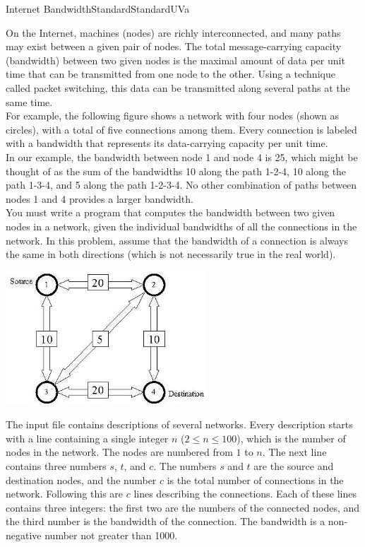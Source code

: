 \begin{problema}{Internet Bandwidth}{Standard}{Standard}{UVa} 


On the Internet, machines (nodes) are richly interconnected, and many paths may exist between a given pair of nodes. The total message-carrying capacity (bandwidth) between two given nodes is the maximal amount of data per unit time that can be transmitted from one node to the other. Using a technique called packet switching, this data can be transmitted along several paths at the same time. \\

For example, the following figure shows a network with four nodes (shown as circles), with a total of five connections among them. Every connection is labeled with a bandwidth that represents its data-carrying capacity per unit time.  \\

In our example, the bandwidth between node 1 and node 4 is 25, which might be thought of as the sum of the bandwidths 10 along the path 1-2-4, 10 along the path 1-3-4, and 5 along the path 1-2-3-4. No other combination of paths between nodes 1 and 4 provides a larger bandwidth. \\

You must write a program that computes the bandwidth between two given nodes in a network, given the individual bandwidths of all the connections in the network. In this problem, assume that the bandwidth of a connection is always the same in both directions (which is not necessarily true in the real world). \\ 


\begin{center}
\includegraphics[height=5cm]{graficos/bandwidth}
\end{center}



\InputFile

The input file contains descriptions of several networks. Every description starts with a line containing a single integer $n$ ($2 \leq n \leq 100$), which is the number of nodes in the network. The nodes are numbered from $1$ to $n$. The next line contains three numbers $s$, $t$, and $c$. The numbers $s$ and $t$ are the source and destination nodes, and the number $c$ is the total number of connections in the network. Following this are $c$ lines describing the connections. Each of these lines contains three integers: the first two are the numbers of the connected nodes, and the third number is the bandwidth of the connection. The bandwidth is a non-negative number not greater than 1000. 


\end{problema}
